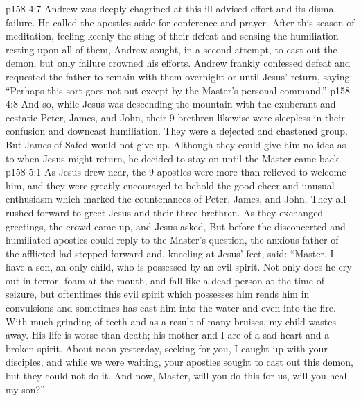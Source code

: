 \vs p158 4:7 Andrew was deeply chagrined at this ill\hyp{}advised effort and its dismal failure. He called the apostles aside for conference and prayer. After this season of meditation, feeling keenly the sting of their defeat and sensing the humiliation resting upon all of them, Andrew sought, in a second attempt, to cast out the demon, but only failure crowned his efforts. Andrew frankly confessed defeat and requested the father to remain with them overnight or until Jesus’ return, saying: “Perhaps this sort goes not out except by the Master’s personal command.”
\vs p158 4:8 And so, while Jesus was descending the mountain with the exuberant and ecstatic Peter, James, and John, their 9 brethren likewise were sleepless in their confusion and downcast humiliation. They were a dejected and chastened group. But James of Safed would not give up. Although they could give him no idea as to when Jesus might return, he decided to stay on until the Master came back.
\vs p158 5:1 As Jesus drew near, the 9 apostles were more than relieved to welcome him, and they were greatly encouraged to behold the good cheer and unusual enthusiasm which marked the countenances of Peter, James, and John. They all rushed forward to greet Jesus and their three brethren. As they exchanged greetings, the crowd came up, and Jesus asked,  But before the disconcerted and humiliated apostles could reply to the Master’s question, the anxious father of the afflicted lad stepped forward and, kneeling at Jesus’ feet, said: “Master, I have a son, an only child, who is possessed by an evil spirit. Not only does he cry out in terror, foam at the mouth, and fall like a dead person at the time of seizure, but oftentimes this evil spirit which possesses him rends him in convulsions and sometimes has cast him into the water and even into the fire. With much grinding of teeth and as a result of many bruises, my child wastes away. His life is worse than death; his mother and I are of a sad heart and a broken spirit. About noon yesterday, seeking for you, I caught up with your disciples, and while we were waiting, your apostles sought to cast out this demon, but they could not do it. And now, Master, will you do this for us, will you heal my son?”
